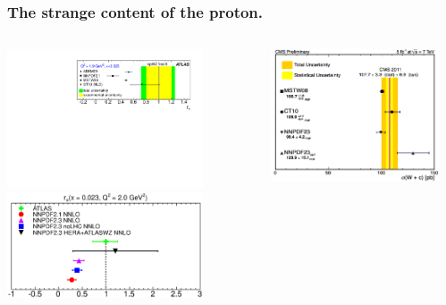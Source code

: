 \documentclass[10pt]{beamer}
\begin{document}
\begin{frame}
\frametitle{The strange content of the proton.}

    \begin{columns}
  \begin{column}{0.5\textwidth}
  \begin{center} 
     \includegraphics[width=0.8\textwidth]{figures/fig2.pdf}\\
       \includegraphics[width=0.8\textwidth]{figures/rs-2.eps}
       \end{center}
               \end{column}
  \begin{column}{0.5\textwidth}
  
    \begin{center} 

   \includegraphics[width=0.9\textwidth]{figures/CMSWc.png}
       \end{center}


\end{column}
\end{columns}
\end{frame}
\end{document}
